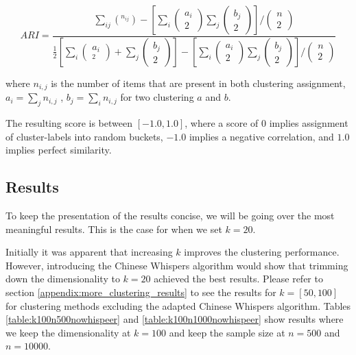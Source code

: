 \documentclass[a4paper,12pt,oneside,openright]{report}
\begin{document}
\begin{equation}
A R I=\frac{\sum_{i j}\left(^{n_{i j}}\right)-\left[\sum_{i}\left(\begin{array}{c}a_{i} \\ 2\end{array}\right) \sum_{j}\left( \begin{array}{c}b_{j} \\ 2\end{array} \right)\right] /\left(\begin{array}{c}n \\ 2\end{array}\right)}{\frac{1}{2}\left[\sum_{i}\left(\begin{array}{c}a_{i} \\ _{2}\end{array}\right)+\sum_{j}\left(\begin{array}{l}b_{j} \\ 2\end{array}\right)\right]-\left[\sum_{i}\left(\begin{array}{c} a_{i} \\ 2\end{array}\right) \sum_{j}\left(\begin{array}{l}b_{j} \\ 2\end{array}\right)\right] /\left(\begin{array}{l}n \\ 2\end{array}\right)}
\end{equation}{\label{eq:adjustedrandomindex}}

where $n_{i,j}$ is the number of items that are present in both clustering assignment, $a_i = \sum_j n_{i,j}$ , $b_j = \sum_i n_{i,j}$ for two clustering $a$ and $b$.

The resulting score is between $[-1.0, 1.0]$, where a score of $0$ implies assignment of cluster-labels into random buckets, $-1.0$ implies a negative correlation, and $1.0$ implies perfect similarity.

\subsection{Results}

To keep the presentation of the results concise, we will be going over the most meaningful results.
This is the case for when we set $k=20$.

Initially it was apparent that increasing $k$ improves the clustering performance.
However, introducing the Chinese Whispers algorithm would show that trimming down the dimensionality to $k=20$ achieved the best results.
Please refer to section \ref{appendix:more_clustering_results} to see the results for $k=[50, 100]$ for clustering methods excluding the adapted Chinese Whispers algorithm.
Tables \ref{table:k100n500nowhispeer} and \ref{table:k100n1000nowhispeer} show results where we keep the dimensionality at $k=100$ and keep the sample size at $n=500$ and $n=10000$. 
\end{document}
